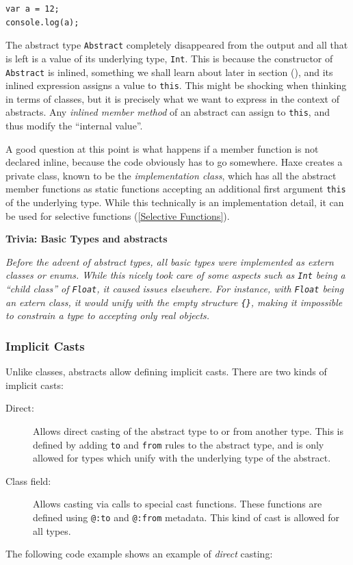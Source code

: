 \documentclass{article}
\newcommand{\type}[1]{\texttt{#1}}
\newcommand{\expr}[1]{\texttt{#1}}
\newenvironment{myshaded}
  {\def\FrameCommand{\fboxsep=\topsep\colorbox{bgcolor}}%
  \MakeFramed {\advance\hsize-\width \FrameRestore}}%
 {\endMakeFramed}
\newcommand{\trivia}[2]
	{\begin{myshaded}\noindent\textbf{Trivia: #1}\par\nobreak\noindent\ignorespaces\textit{#2}\end{myshaded}}
\newcommand{\Fullref}[1]{\nameref{#1} (\Cref{#1})}
\newcommand{\tref}[2]{#1 (\ref{#2})}
\begin{document}
\begin{lstlisting}
var a = 12;
console.log(a);
\end{lstlisting}
The abstract type \type{Abstract} completely disappeared from the output and all that is left is a value of its underlying type, \type{Int}. This is because the constructor of \type{Abstract} is inlined, something we shall learn about later in section \Fullref{Inline}, and its inlined expression assigns a value to \expr{this}. This might be shocking when thinking in terms of classes, but it is precisely what we want to express in the context of abstracts. Any \emph{inlined member method} of an abstract can assign to \expr{this}, and thus modify the ``internal value''.

A good question at this point is what happens if a member function is not declared inline, because the code obviously has to go somewhere. Haxe creates a private class, known to be the \emph{implementation class}, which has all the abstract member functions as static functions accepting an additional first argument \expr{this} of the underlying type. While this technically is an implementation detail, it can be used for \tref{selective functions}{Selective Functions}.



\trivia{Basic Types and abstracts}{Before the advent of abstract types, all basic types were implemented as extern classes or enums. While this nicely took care of some aspects such as \type{Int} being a ``child class'' of \type{Float}, it caused issues elsewhere. For instance, with \type{Float} being an extern class, it would unify with the empty structure \expr{\{\}}, making it impossible to constrain a type to accepting only real objects.}




\subsubsection{Implicit Casts}
\label{Implicit Casts}

Unlike classes, abstracts allow defining implicit casts. There are two kinds of implicit casts:

\begin{description}
	\item[Direct:] Allows direct casting of the abstract type to or from another type. This is defined by adding \expr{to} and \expr{from} rules to the abstract type, and is only allowed for types which unify with the underlying type of the abstract.
	\item[Class field:] Allows casting via calls to special cast functions. These functions are defined using \expr{@:to} and \expr{@:from} metadata. This kind of cast is allowed for all types.
\end{description}
The following code example shows an example of \emph{direct} casting:
\end{document}
